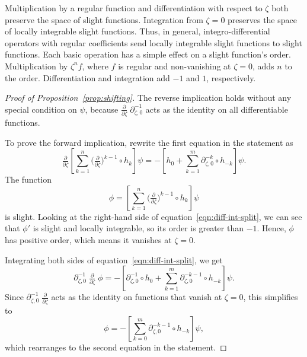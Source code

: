 \documentclass{article}
\theoremstyle{definition}
\newcommand{\fracderiv}[3]{\partial^{#1}_{#2, #3}}
\begin{document}
Multiplication by a regular function and differentiation with respect to $\zeta$ both preserve the space of slight functions. Integration from $\zeta = 0$ preserves the space of locally integrable slight functions. Thus, in general, integro-differential operators with regular coefficients send locally integrable slight functions to slight functions. Each basic operation has a simple effect on a slight function's order. Multiplication by $\zeta^n f$, where $f$ is regular and non-vanishing at $\zeta = 0$, adds $n$ to the order. Differentiation and integration add $-1$ and $1$, respectively.
\begin{proof}[Proof of Proposition~\ref{prop:shifting}]
The reverse implication holds without any special condition on $\psi$, because $\tfrac{\partial}{\partial \zeta}\;\fracderiv{-1}{\zeta}{0}$ acts as the identity on all differentiable functions.

To prove the forward implication, rewrite the first equation in the statement as
\begin{equation}\label{eqn:diff-int-split}
\tfrac{\partial}{\partial \zeta} \left[ \sum_{k = 1}^n \big(\tfrac{\partial}{\partial \zeta}\big)^{k-1} \circ h_k \right] \psi = -\left[ h_0 + \sum_{k = 1}^m \fracderiv{-k}{\zeta}{0} \circ h_{-k} \right] \psi.
\end{equation}
The function
\[ \phi = \left[ \sum_{k = 1}^n \big(\tfrac{\partial}{\partial \zeta}\big)^{k-1} \circ h_k \right] \psi \]
is slight. Looking at the right-hand side of equation~\eqref{eqn:diff-int-split}, we can see that $\phi'$ is slight and locally integrable, so its order is greater than $-1$. Hence, $\phi$ has positive order, which means it vanishes at $\zeta = 0$.

Integrating both sides of equation~\eqref{eqn:diff-int-split}, we get
\[ \fracderiv{-1}{\zeta}{0}\;\tfrac{\partial}{\partial \zeta}\;\phi = -\left[ \fracderiv{-1}{\zeta}{0} \circ h_0 + \sum_{k = 1}^m \fracderiv{-k-1}{\zeta}{0} \circ h_{-k} \right] \psi. \]
Since $\fracderiv{-1}{\zeta}{0}\;\tfrac{\partial}{\partial \zeta}$ acts as the identity on functions that vanish at $\zeta = 0$, this simplifies to
\[ \phi = -\left[ \sum_{k = 0}^m \fracderiv{-k-1}{\zeta}{0} \circ h_{-k} \right] \psi, \]
which rearranges to the second equation in the statement.
\end{proof}

\end{document}
